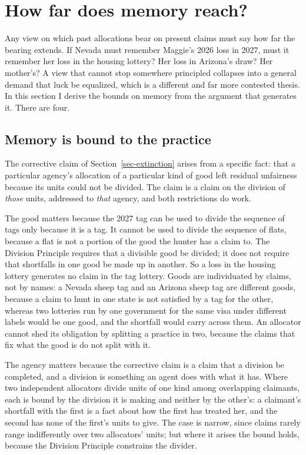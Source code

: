 \documentclass[
  11pt,
  letterpaper,
  DIV=11,
  numbers=noendperiod,
  twoside]{scrartcl}
\newcounter{none} %
\begin{document}
\section{How far does memory reach?}\label{sec-reach}

Any view on which past allocations bear on present claims must say how
far the bearing extends. If Nevada must remember Maggie's 2026 loss in
2027, must it remember her loss in the housing lottery? Her loss in
Arizona's draw? Her mother's? A view that cannot stop somewhere
principled collapses into a general demand that luck be equalized, which
is a different and far more contested thesis. In this section I derive
the bounds on memory from the argument that generates it. There are
four.

\subsection{Memory is bound to the
practice}\label{memory-is-bound-to-the-practice}

The corrective claim of Section~\ref{sec-extinction} arises from a
specific fact: that a particular agency's allocation of a particular
kind of good left residual unfairness because its units could not be
divided. The claim is a claim on the division of \emph{those} units,
addressed to \emph{that} agency, and both restrictions do work.

The good matters because the 2027 tag can be used to divide the sequence
of tags only because it is a tag. It cannot be used to divide the
sequence of flats, because a flat is not a portion of the good the
hunter has a claim to. The Division Principle requires that a divisible
good be divided; it does not require that shortfalls in one good be made
up in another. So a loss in the housing lottery generates no claim in
the tag lottery. Goods are individuated by claims, not by names: a
Nevada sheep tag and an Arizona sheep tag are different goods, because a
claim to hunt in one state is not satisfied by a tag for the other,
whereas two lotteries run by one government for the same visa under
different labels would be one good, and the shortfall would carry across
them. An allocator cannot shed its obligation by splitting a practice in
two, because the claims that fix what the good is do not split with it.

The agency matters because the corrective claim is a claim that a
division be completed, and a division is something an agent does with
what it has. Where two independent allocators divide units of one kind
among overlapping claimants, each is bound by the division it is making
and neither by the other's: a claimant's shortfall with the first is a
fact about how the first has treated her, and the second has none of the
first's units to give. The case is narrow, since claims rarely range
indifferently over two allocators' units; but where it arises the bound
holds, because the Division Principle constrains the divider.
\end{document}
